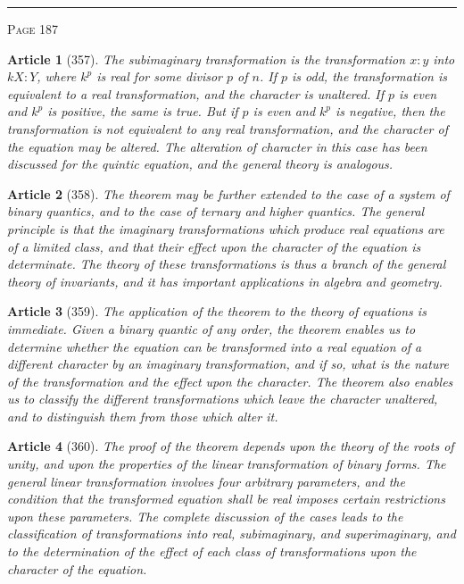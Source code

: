 \documentclass[11pt,a4paper]{article}
\theoremstyle{cayley}
\newtheorem{art}{Article}
\begin{document}
\vspace{1em}
\noindent\rule{\textwidth}{0.4pt}
\begin{center}\textsc{Page 187}\end{center}
\newpage

\begin{art}[357]
The subimaginary transformation is the transformation $x:y$ into $kX:Y$, where $k^p$ is real for some divisor $p$ of $n$. If $p$ is odd, the transformation is equivalent to a real transformation, and the character is unaltered. If $p$ is even and $k^p$ is positive, the same is true. But if $p$ is even and $k^p$ is negative, then the transformation is not equivalent to any real transformation, and the character of the equation may be altered. The alteration of character in this case has been discussed for the quintic equation, and the general theory is analogous.
\end{art}

\begin{art}[358]
The theorem may be further extended to the case of a system of binary quantics, and to the case of ternary and higher quantics. The general principle is that the imaginary transformations which produce real equations are of a limited class, and that their effect upon the character of the equation is determinate. The theory of these transformations is thus a branch of the general theory of invariants, and it has important applications in algebra and geometry.
\end{art}

\begin{art}[359]
The application of the theorem to the theory of equations is immediate. Given a binary quantic of any order, the theorem enables us to determine whether the equation can be transformed into a real equation of a different character by an imaginary transformation, and if so, what is the nature of the transformation and the effect upon the character. The theorem also enables us to classify the different transformations which leave the character unaltered, and to distinguish them from those which alter it.
\end{art}

\begin{art}[360]
The proof of the theorem depends upon the theory of the roots of unity, and upon the properties of the linear transformation of binary forms. The general linear transformation involves four arbitrary parameters, and the condition that the transformed equation shall be real imposes certain restrictions upon these parameters. The complete discussion of the cases leads to the classification of transformations into real, subimaginary, and superimaginary, and to the determination of the effect of each class of transformations upon the character of the equation.
\end{art}
\end{document}
